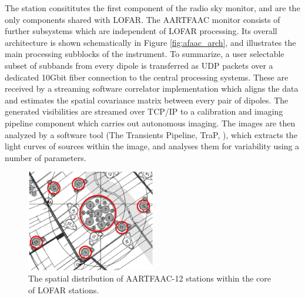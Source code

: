 \documentclass{ws-jai}
\begin{document}
The station consititutes  the first component of the radio  sky monitor, and are
the only components shared with LOFAR.  The AARTFAAC monitor consists of further
subsystems which are independent of  LOFAR processing.  Its overall architecture
is shown schematically in Figure  \ref{fig:afaac_arch}, and illustrates the main
processing subblocks of the instrument.   To summarize, a user selectable subset
of subbands  from every dipole  is transferred as  UDP packets over  a dedicated
10Gbit fiber connection  to the central processing systems.   These are received
by  a streaming  software correlator  implementation which  aligns the  data and
estimates  the spatial  covariance matrix  between every  pair of  dipoles.  The
generated visibilities  are streamed  over TCP/IP to  a calibration  and imaging
pipeline component  which carries out  autonomous imaging.  The images  are then
analyzed    by   a    software    tool   (The    Transients   Pipeline,    TraP,
\citep{swinbank2015lofar}), which  extracts the  light curves of  sources within
the image, and analyses them for variability using a number of parameters.


\begin{figure}[htbp]
\includegraphics[width=0.5\textwidth]{Figs/afaac12_arrayconfig.png}
\caption{The spatial distribution of AARTFAAC-12 stations within the core of LOFAR stations.}
\label{fig:afaac12_arrayconfig}
\end{figure}
\end{document}
